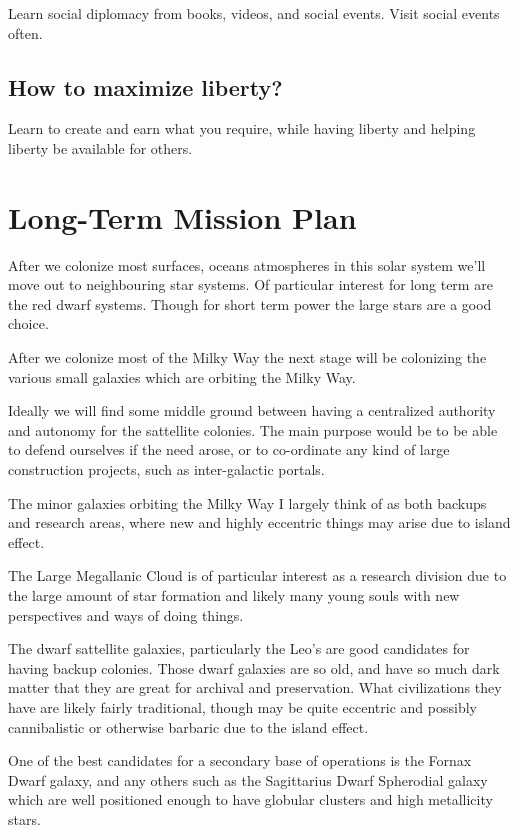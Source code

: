 \documentclass{report}
\begin{document}
Learn social diplomacy from books, videos, and social events.
Visit social events often.

\subsection{How to maximize liberty?}

Learn to create and earn what you require,
while having liberty and helping liberty be available for others.


\section{Long-Term Mission Plan}

After we colonize most surfaces, oceans atmospheres in this solar system we'll
move out to neighbouring star systems.  Of particular interest for long term are
the red dwarf systems.  Though for short term power the large stars are a good
choice. 

After we colonize most of the Milky Way the next stage will be colonizing the
various small galaxies which are orbiting the Milky Way. 

Ideally we will find some middle ground between having a centralized authority
and autonomy for the sattellite colonies.  The main purpose would be to be able
to defend ourselves if the need arose, or to co-ordinate any kind of large
construction projects, such as inter-galactic portals. 

The minor galaxies orbiting the Milky Way I largely think of as both backups and
research areas, where new and highly eccentric things may arise due to island
effect. 

The Large Megallanic Cloud is of particular interest as a research
division due to the large amount of star formation and likely many young souls
with new perspectives and ways of doing things. 

The dwarf sattellite galaxies, particularly the Leo's are good candidates for 
having backup colonies. Those dwarf galaxies are so old, and have so much dark
matter that they are great for archival and preservation. What civilizations
they have are likely fairly traditional, though may be quite eccentric and
possibly cannibalistic or otherwise barbaric due to the island effect. 

One of the best candidates for a secondary base of operations is the Fornax
Dwarf galaxy, and any others such as the Sagittarius Dwarf Spherodial galaxy 
which are well positioned enough to have globular clusters and 
high metallicity stars.
\end{document}
